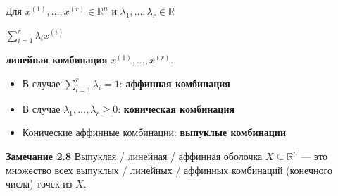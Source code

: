 \vspace{8pt}
Для $x^{(1)}, \dots , x^{(r)} \in \mathbb{R}^n$ и $\lambda_1, \dots , \lambda_r \in \mathbb{R}$
\begin{center}
$\sum_{i=1}^r \lambda_ix^{(i)}$
\end{center}
{\bf линейная комбинация} $x^{(1)}, \dots , x^{(r)}$.

\begin{itemize}
\item В случае $\sum_{i=1}^r \lambda_i=1$: {\bf аффинная комбинация}
\item В случае $\lambda_1, \dots , \lambda_r \ge 0$: {\bf коническая комбинация}
\item Конические аффинные комбинации: {\bf выпуклые комбинации}
\end{itemize}

{\bf Замечание 2.8}
Выпуклая / линейная / аффинная оболочка $X \subseteq \mathbb{R}^n$ --- это множество всех выпуклых / линейных / аффинных комбинаций (конечного числа) точек из $X$.\\ 